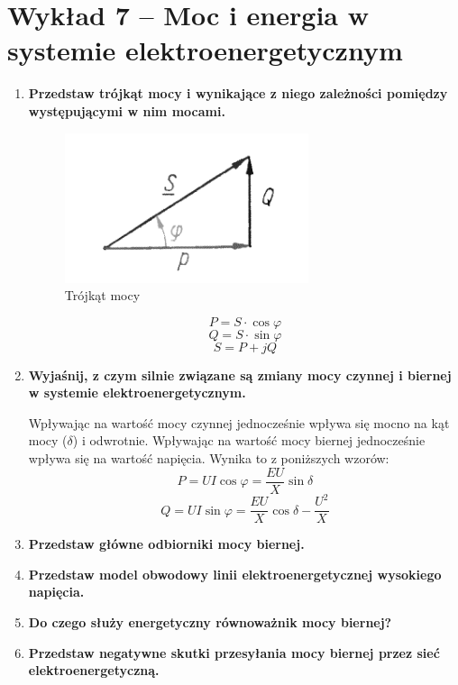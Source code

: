 \documentclass[12pt]{article}
\newcommand{\pytanie}[1]{\item \textbf{#1}}
\begin{document}
\section{Wykład 7 -- Moc i energia w systemie elektroenergetycznym}
\begin{enumerate}
	\pytanie{Przedstaw trójkąt mocy i wynikające z niego zależności pomiędzy występującymi w nim mocami.}
	
	  \begin{figure}[H]
	      \centering
	      \includegraphics[width=0.3\linewidth]{images/wyklad7_1.png}
	      \caption*{Trójkąt mocy}
	  \end{figure}
	  \begin{equation*}
	      P = S \cdot \cos\varphi
	  \end{equation*}
	  \begin{equation*}
	      Q = S \cdot \sin\varphi
	  \end{equation*}
	  \begin{equation*}
	      S = P + jQ
	  \end{equation*}
	
	\pytanie{Wyjaśnij, z czym silnie związane są zmiany mocy czynnej i biernej w systemie 
	elektroenergetycznym.}
	
	  Wpływając na wartość mocy czynnej jednocześnie wpływa się mocno na kąt mocy ($\delta$) i odwrotnie.
	  Wpływając na wartość mocy biernej jednocześnie wpływa się na wartość napięcia.
	  Wynika to z poniższych wzorów:
	  \begin{equation*}
	      P = U I \cos\varphi = \frac{E U}{X} \sin\delta
	  \end{equation*}
	  \begin{equation*}
	      Q = U I \sin\varphi = \frac{E U}{X} \cos\delta - \frac{U^2}{X}
	  \end{equation*}
	
	\pytanie{Przedstaw główne odbiorniki mocy biernej.}
	
	  
	
	\pytanie{Przedstaw model obwodowy linii elektroenergetycznej wysokiego napięcia.}
	
	\pytanie{Do czego służy energetyczny równoważnik mocy biernej?}
	
	\pytanie{Przedstaw negatywne skutki przesyłania mocy biernej przez sieć 
	elektroenergetyczną.}
	

\end{enumerate}
\end{document}
